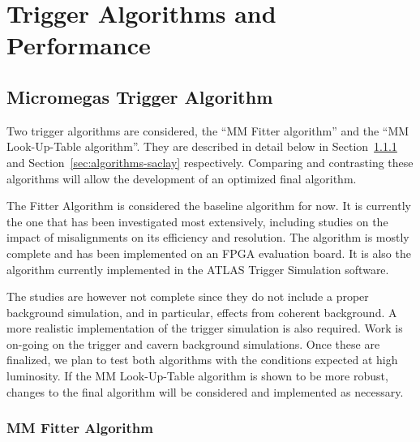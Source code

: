 \documentclass[USenglish]{latex/atlasdoc}
\begin{document}
\FloatBarrier

\section{Trigger Algorithms and Performance}
\label{sec:algorithms}
\subsection{Micromegas Trigger Algorithm}

Two \MM trigger algorithms are considered, the ``MM Fitter algorithm''
and the ``MM Look-Up-Table algorithm''. 
They are described in detail below in Section~\ref{sec:algorithms-harvard} and
Section~\ref{sec:algorithms-saclay} respectively.
Comparing and contrasting these algorithms will allow the development of an optimized final algorithm.

The \MM Fitter Algorithm is considered the baseline algorithm for now.
It is currently the one that has been investigated most extensively, including
studies on the impact of misalignments on its efficiency and resolution.
The algorithm is mostly complete and has been implemented on an FPGA evaluation board.
It is also the algorithm currently implemented in the ATLAS Trigger Simulation software.

The studies are however not complete since they do not include a proper background simulation, and in particular, effects from coherent background. 
A more realistic implementation of the trigger simulation is also required. 
Work is on-going on the trigger and cavern background simulations. Once these are finalized, we plan to test both algorithms with the conditions expected at high luminosity.
If the MM Look-Up-Table algorithm is shown to be more robust, changes to the final algorithm will be considered and implemented as necessary.


\subsubsection{MM Fitter Algorithm}
\label{sec:algorithms-harvard}

\FloatBarrier
\end{document}
